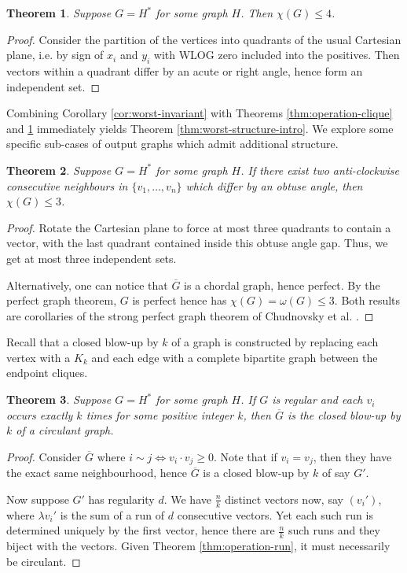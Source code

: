 \documentclass[11pt]{article}
\newtheorem{thm}{Theorem}[section]
\begin{document}
\begin{thm}\label{thm:operation-chromatic}
    Suppose $G = H^*$ for some graph $H$. Then $\chi(G) \le 4$. 
\end{thm}
\begin{proof}
    Consider the partition of the vertices into quadrants of the usual Cartesian plane, i.e. by sign of $x_i$ and $y_i$ with WLOG zero included into the positives. Then vectors within a quadrant differ by an acute or right angle, hence form an independent set.
\end{proof}

Combining Corollary \ref{cor:worst-invariant} with Theorems \ref{thm:operation-clique} and \ref{thm:operation-chromatic} immediately yields Theorem \ref{thm:worst-structure-intro}. We explore some specific sub-cases of output graphs which admit additional structure. 

\begin{thm}\label{thm:operation-three}
    Suppose $G = H^*$ for some graph $H$. If there exist two anti-clockwise consecutive neighbours in $\{v_1, \dots, v_n\}$ which differ by an obtuse angle, then $\chi(G) \le 3$. 
\end{thm}
\begin{proof}
    Rotate the Cartesian plane to force at most three quadrants to contain a vector, with the last quadrant contained inside this obtuse angle gap. Thus, we get at most three independent sets. 

    Alternatively, one can notice that $\overline{G}$ is a chordal graph, hence perfect. By the perfect graph theorem, $G$ is perfect hence has $\chi(G) = \omega(G) \le 3$. Both results are corollaries of the strong perfect graph theorem of Chudnovsky et al. \cite{chudnovsky2006perfect}.
\end{proof}

Recall that a closed blow-up by $k$ of a graph is constructed by replacing each vertex with a $K_k$ and each edge with a complete bipartite graph between the endpoint cliques.

\begin{thm}\label{thm:operation-regular}
    Suppose $G = H^*$ for some graph $H$. If $G$ is regular and each $v_i$ occurs exactly $k$ times for some positive integer $k$, then $\overline{G}$ is the closed blow-up by $k$ of a circulant graph. 
\end{thm}
\begin{proof}
    Consider $\overline{G}$ where $i \sim j \iff v_i \cdot v_j \ge 0$. Note that if $v_i = v_j$, then they have the exact same neighbourhood, hence $\overline{G}$ is a closed blow-up by $k$ of say $G'$. 

    Now suppose $G'$ has regularity $d$. We have $\frac{n}{k}$ distinct vectors now, say $(v_i')$, where $\lambda v_i'$ is the sum of a run of $d$ consecutive vectors. Yet each such run is determined uniquely by the first vector, hence there are $\frac{n}{k}$ such runs and they biject with the vectors. Given Theorem \ref{thm:operation-run}, it must necessarily be circulant. 
\end{proof}
\end{document}
